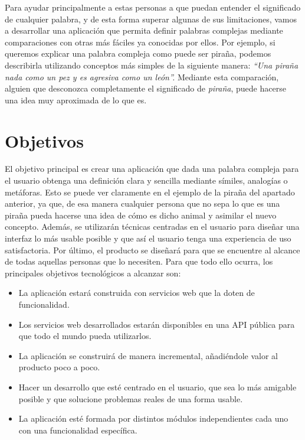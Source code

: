 Para ayudar principalmente a estas personas a que puedan entender el significado de cualquier palabra, y de esta forma superar algunas de sus limitaciones, vamos a desarrollar una aplicación que permita definir palabras complejas mediante comparaciones con otras más fáciles ya conocidas por ellos. Por ejemplo, si queremos explicar una palabra compleja como puede ser piraña, podemos describirla utilizando conceptos más simples de la siguiente manera:\textit{ ``Una piraña nada como un pez y es agresiva como un león''.} Mediante esta comparación, alguien que desconozca completamente el significado de \textit{piraña}, puede hacerse una idea muy aproximada de lo que es.


\section{Objetivos}
\label{cap:sec:objetivos}

El objetivo principal es crear una aplicación que dada una palabra compleja para el usuario obtenga una definición clara y sencilla mediante símiles, analogías o metáforas. 
Esto se puede ver claramente en el ejemplo de la piraña del apartado anterior, ya que, de esa manera cualquier persona que no sepa lo que es una piraña pueda hacerse una idea de cómo es dicho animal y asimilar el nuevo concepto. Además, se utilizarán técnicas centradas en el usuario para diseñar una interfaz lo más usable posible y que así el usuario tenga una experiencia de uso satisfactoria. Por último, el producto se diseñará para que se encuentre al alcance de todas aquellas personas que lo necesiten.
 Para que todo ello ocurra, los principales objetivos tecnológicos a alcanzar son:
\begin{itemize}
	\item La aplicación estará construida con servicios web que la doten de funcionalidad. 
	\item Los servicios web desarrollados estarán disponibles en una API pública para que todo el mundo pueda utilizarlos.	
	\item La aplicación se construirá de manera incremental, añadiéndole valor al producto poco a poco.	
	\item Hacer un desarrollo que esté centrado en el usuario, que sea lo más amigable posible y que solucione problemas reales de una forma usable.
	\item La aplicación esté formada por distintos módulos independientes cada uno con una funcionalidad específica. 
\end{itemize}

